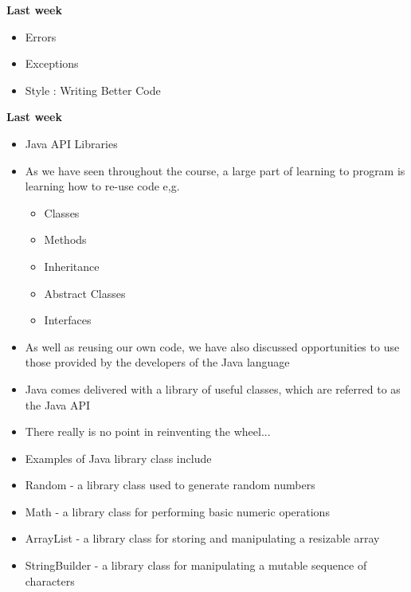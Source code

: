 \documentclass{beamer}
\begin{document}
\begin{frame}
\begin{center}
\textbf{Last week }
\end{center}
\begin{itemize}
\item Errors
\item Exceptions
\item Style : Writing Better Code
\end{itemize}
\end{frame}

\begin{frame}
\begin{center}
\textbf{Last week }
\end{center}
\begin{itemize}
\item Java API Libraries
\end{itemize}
\end{frame}

\begin{frame}
\begin{itemize}
\item As we have seen throughout the course, a large part of learning to program is learning how to re-use code e,g.
\begin{itemize}
\item Classes
\item Methods
\item Inheritance
\item Abstract Classes
\item Interfaces
\end{itemize}
\item As well as reusing our own code, we have also discussed opportunities to use those provided by the developers of the Java language
\end{itemize}
\end{frame}

\begin{frame}
\begin{itemize}
\item Java comes delivered with a library of useful classes, which are referred to as the Java API 
\item There really is no point in reinventing the wheel...
\end{itemize}
\end{frame} 

\begin{frame}
\begin{itemize}
\item Examples of Java library class include
\bigskip
\item Random - a library class used to generate random numbers
\item Math - a library class for performing basic numeric operations
\item ArrayList - a library class for storing and manipulating a resizable array
\item StringBuilder - a library class for manipulating a mutable sequence of characters
\end{itemize}
\end{frame}
\end{document}
